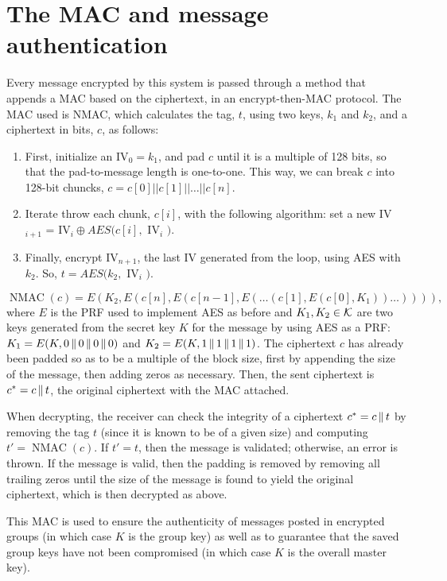 \documentclass{amsart}
\begin{document}
\section{The MAC and message authentication}
Every message encrypted by this system is passed through a method that appends a MAC based on the ciphertext, in an encrypt-then-MAC protocol. The MAC used is NMAC, which calculates the tag, $t$, using two keys, $k_1$ and $k_2$, and a ciphertext in bits, $c$, as follows:
\begin{enumerate}
  \item First, initialize an IV$_0 = k_1$, and pad $c$ until it is a multiple of 128 bits, so that the pad-to-message length is one-to-one. This way, we can break $c$ into 128-bit chuncks, $c = c[0]||c[1]|| \dots ||c[n]$.
  \item Iterate throw each chunk, $c[i]$, with the following algorithm: set a new IV$_{i+1}$ = IV$_i \oplus AES(c[i], $ IV$_i$ $)$.
  \item Finally, encrypt IV$_{n+1}$, the last IV generated from the loop, using AES with $k_2$. So, $t = AES(k_2,$ IV$_i$ $)$.
\end{enumerate}

\[\operatorname{NMAC}(c) = E(K_2,E(c[n],E(c[n-1],E(\dots(c[1],E(c[0],K_1))\dots)))),\]
where $E$ is the PRF used to implement AES as before and $K_1,K_2\in\mathcal K$ are two keys generated from the secret key $K$ for the message by using AES as a PRF: $K_1 = E(K,0\operatorname{\|} 0\operatorname{\|} 0\operatorname{\|} 0)$ and $K_2 = E(K,1\operatorname{\|} 1\operatorname{\|} 1\operatorname{\|} 1)$. The ciphertext $c$ has already been padded so as to be a multiple of the block size, first by appending the size of the message, then adding zeros as necessary. Then, the sent ciphertext is $c^* = c\operatorname{\|} t$, the original ciphertext with the MAC attached.

When decrypting, the receiver can check the integrity of a ciphertext $c^* = c\operatorname{\|} t$ by removing the tag $t$ (since it is known to be of a given size) and computing $t' = \operatorname{NMAC}(c)$. If $t' = t$, then the message is validated; otherwise, an error is thrown. If the message is valid, then the padding is removed by removing all trailing zeros until the size of the message is found to yield the original ciphertext, which is then decrypted as above.

This MAC is used to ensure the authenticity of messages posted in encrypted groups (in which case $K$ is the group key) as well as to guarantee that the saved group keys have not been compromised (in which case $K$ is the overall master key).
\end{document}
